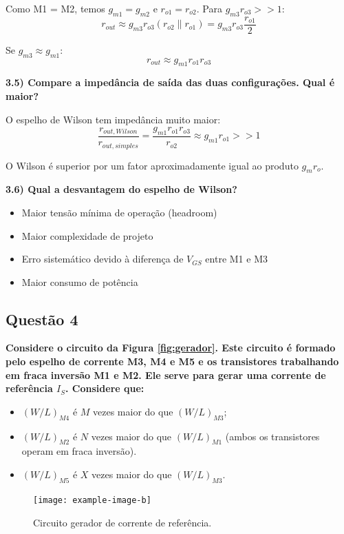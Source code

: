 ﻿\documentclass[12pt,a4paper]{article}
\begin{document}
Como M1 = M2, temos $g_{m1} = g_{m2}$ e $r_{o1} = r_{o2}$. Para $g_{m3} r_{o3} >> 1$:
$$r_{out} \approx g_{m3} r_{o3} (r_{o2} \parallel r_{o1}) = g_{m3} r_{o3} \frac{r_{o1}}{2}$$

Se $g_{m3} \approx g_{m1}$:
$$\boxed{r_{out} \approx g_{m1} r_{o1} r_{o3}}$$

\textbf{3.5) Compare a impedância de saída das duas configurações. Qual é maior?}

O espelho de Wilson tem impedância muito maior:
$$\frac{r_{out,Wilson}}{r_{out,simples}} = \frac{g_{m1} r_{o1} r_{o3}}{r_{o2}} \approx g_{m1} r_{o1} >> 1$$

O Wilson é superior por um fator aproximadamente igual ao produto $g_m r_o$.

\textbf{3.6) Qual a desvantagem do espelho de Wilson?}

\begin{itemize}
    \item Maior tensão mínima de operação (headroom)
    \item Maior complexidade de projeto
    \item Erro sistemático devido à diferença de $V_{GS}$ entre M1 e M3
    \item Maior consumo de potência
\end{itemize}

\subsection*{Questão 4}
\textbf{Considere o circuito da Figura \ref{fig:gerador}. Este circuito é formado pelo espelho de corrente M3, M4 e M5 e os transistores trabalhando em fraca inversão M1 e M2. Ele serve para gerar uma corrente de referência $I_S$. Considere que:}
\begin{itemize}
    \item $(W/L)_{M4}$ é $M$ vezes maior do que $(W/L)_{M3}$;
    \item $(W/L)_{M2}$ é $N$ vezes maior do que $(W/L)_{M1}$ (ambos os transistores operam em fraca inversão).
    \item $(W/L)_{M5}$ é $X$ vezes maior do que $(W/L)_{M3}$.
\end{itemize}

\begin{figure}[H]
    \centering
    \texttt{[image: example-image-b]}
    \caption{Circuito gerador de corrente de referência.}
    \label{fig:gerador_corrente}
\end{figure}
\end{document}
